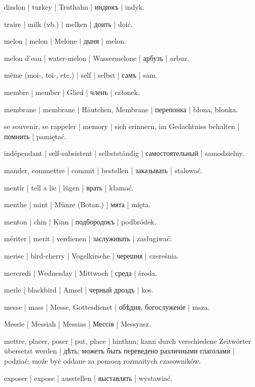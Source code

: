 \begin{outdent}{1em}
dindon | turkey | Truthahn | индюкъ | indyk.

traire | milk (vb.) | melken | доить | doić.

melon | melon | Melone | дыня | melon.

\uvsubentry{}
melon d’eau | water-melon | Wassermelone | арбузъ | arbuz.

même (moi-, toi-, etc.) | self | selbst | самъ | sam.

membre | member | Glied | членъ | członek.

membrane | membrane | Häutchen, Membrane | перепонка | błona, błonka.

se souvenir, se rappeler | memory | sich erinnern, im Gedachtniss behalten | помнить | pamiętać.

indépendant | self-subsistent | selbstständig | самостоятельный | samodzielny.

mander, commettre | commit | bestellen | заказывать | stalować.

mentir | tell a lie | lügen | врать | kłamać.

menthe | mint | Münze (Botan.) | мята | mięta.

menton | chin | Kinn | подбородокъ | podbródek.

mériter | merit | verdienen | заслуживать | zasługiwać.

merise | bird-cherry | Vogelkirsche | черешня | czereśnia.

mercredi | Wednesday | Mittwoch | среда | środa.

merle | blackbird | Amsel | черный дроздъ | kos.

messe | mass | Messe, Gottesdienst | обѣдня, богослуженіе | msza.

Messie | Messiah | Messias | Мессія | Messyasz.

mettre, placer, poser | put, place | hinthun; kann durch
verschiedene Zeitwörter übersetzt werden | дѣть; можетъ быть
переведено различными глаголами | podziać; moźe być oddane za pomocą
rozmaitych czasowników.

\uvsubentry{}
exposer | expose | ausstellen | выставлять | wystawiać.


\end{outdent}
